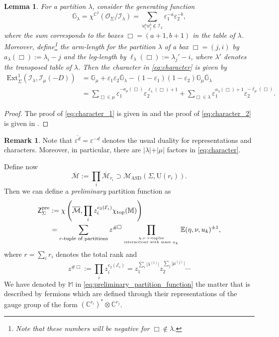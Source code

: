 \documentclass[11pt,colorinlistoftodos]{amsart}
\numberwithin{equation}{subsection}
\theoremstyle{plain}
\newtheorem{lem}[thm]{Lemma}
\theoremstyle{definition}
\newtheorem{rem}[thm]{Remark}
\theoremstyle{remark}
\newcommand{\E}{\mathbb{E}}
\newcommand{\C}{\mathbb{C}}
\newcommand{\calI}{\mathcal{I}}
\newcommand{\calM}{\mathcal{M}}
\begin{document}
\begin{lem}
For a partition $\lambda$, consider the generating function 
\[
\mathbb{G}_\lambda=\chi^{\C^2}(\mathcal{O}_\Sigma/\calI_\lambda)=\sum_{u_i^au_j^b\not\in \calI_\lambda}\varepsilon_1^{-a}\varepsilon_2^{-b},
\]
where the sum corresponds to the boxes $\Box=(a+1,b+1)$ in the table of $\lambda$. Moreover, define\footnote{Note that these numbers will be negative for $\Box\not\in \lambda$.} the \emph{arm-length} for the partition $\lambda$ of a box $\Box=(j,i)$ by $a_\lambda(\Box):=\lambda_i-j$ and the \emph{leg-length} by $\ell_\lambda(\Box):=\lambda_j'-i$, where $\lambda'$ denotes the transposed table of $\lambda$. 
Then the character in \eqref{eq:character} is given by 
\begin{align}
    \label{eq:character_1}
    \mathrm{Ext}^1_{\overline{\Sigma}}(\calI_\lambda,\calI_\mu(-D))&=\mathbb{G}_\mu+\varepsilon_1\varepsilon_2\overline{\mathbb{G}}_\lambda-(1-\varepsilon_1)(1-\varepsilon_2)\mathbb{G}_\mu\overline{\mathbb{G}}_\lambda\\
    \label{eq:character_2}
    &=\sum_{\Box\in\mu}\varepsilon_1^{-a_\mu(\Box)}\varepsilon_2^{\ell_\lambda(\Box)+1}+\sum_{\Box\in \lambda}\varepsilon_1^{a_\lambda(\Box)+1}\varepsilon_2^{-\ell_\mu(\Box)}.
\end{align}
\end{lem}
\begin{proof}
The proof of \eqref{eq:character_1} is given in \cite[Lemma 3.1]{Okounkov2019} and the proof of \eqref{eq:character_2} is given in \cite[Lemma 3]{CarlssonOkounkov2012}.
\end{proof}
\begin{rem}
Note that $\overline{\varepsilon^d}=\varepsilon^{-d}$ denotes the usual duality for representations and characters. Moreover, in particular, there are $\vert\lambda\vert+\vert\mu\vert$ factors in \eqref{eq:character}.
\end{rem}

Define now 
\begin{equation}
    \overline{\calM}:=\prod_i \overline{\calM}_{r_i}\supset \calM_\mathrm{ASD}(\Sigma,\mathrm{U}(r_i)).
\end{equation}
Then we can define a \emph{preliminary} partition function as
\begin{align}
\label{eq:preliminary_partition_function}
\begin{split}
\mathsf{Z}^{\mathrm{pre}}_\Sigma&:=\chi\left(\overline{\calM},\prod_i z_i^{c_2(\mathcal{E}_i)}\chi_\mathrm{top}(\mathbb{M})\right)\\
&=\sum_{\text{$r$-tuple of partitions}}z^{\#\Box}\prod_{\eta,\nu \text{ $r$-tuples}\atop\text{interactions with mass $u_k$}}\E(\eta,\nu,u_k)^{\pm 1},
\end{split}
\end{align}
where $r=\sum_i r_i$ denotes the total rank and 
\[
z^{\#\Box}:=\prod_i z_i^{c_2(\mathcal{E}_i)}=z_1^{\sum_i\vert \lambda^{(i)}\vert}z_2^{\sum_j\vert\mu^{(j)}\vert}\dotsm 
\]
We have denoted by $\mathbb{M}$ in \eqref{eq:preliminary_partition_function} the matter that is described by fermions which are defined through their representations of the gauge group of the form $(\C^{r_i})^*\otimes \C^{r_j}$. 
\end{document}
